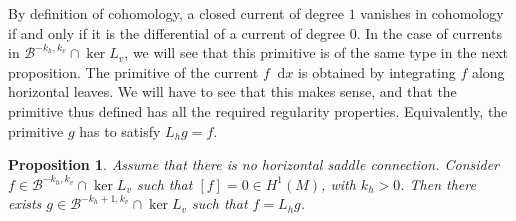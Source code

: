 \documentclass[JEP,XML,SOM,Unicode]{cedram}
\newcommand{\boB}{\mathcal{B}}
\newcommand{\dd}{\mathop{}\!\mathrm{d}}
\newtheorem{prop}[thm]{Proposition}
\theoremstyle{definition}
\numberwithin{equation}{section}
\begin{document}
By definition of cohomology, a closed current of degree $1$ vanishes in
cohomology if and only if it is the differential of a current of degree $0$.
In the case of currents in $\boB^{-k_h, k_v} \cap \ker L_v$, we will see that
this primitive is of the same type in the next proposition. The primitive of
the current $f \dd x$ is obtained by integrating $f$ along horizontal leaves.
We will have to see that this makes sense, and that the primitive thus
defined has all the required regularity properties. Equivalently, the
primitive $g$ has to satisfy $L_h g = f$.

\begin{prop}
\label{prop:integre_Lu} Assume that there is no horizontal saddle connection.
Consider $f \in \boB^{-k_h, k_v} \cap \ker L_v$ such that $[f] = 0 \in
H^1(M)$, with $k_h>0$. Then there exists $g \in \boB^{-k_h+1, k_v} \cap \ker
L_v$ such that $f = L_h g$.
\end{prop}
\end{document}
